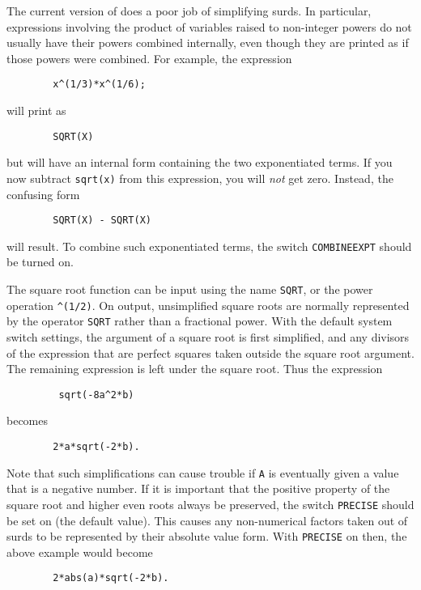 The current version of {\REDUCE} does a poor job of simplifying surds.  In
particular, expressions involving the product of variables raised to
non-integer powers do not usually have their powers combined internally,
even though they are printed as if those powers were combined.  For
example, the expression
\begin{verbatim}
        x^(1/3)*x^(1/6);
\end{verbatim}
will print as
\begin{verbatim}
        SQRT(X)
\end{verbatim}
but will have an internal form containing the two exponentiated terms.
If you now subtract {\tt sqrt(x)} from this expression, you will {\em not\/}
get zero.  Instead, the confusing form
\begin{verbatim}
        SQRT(X) - SQRT(X)
\end{verbatim}
will result.  To combine such exponentiated terms, the switch
{\tt COMBINEEXPT} should be turned on.

The square root function can be input using the name {\tt SQRT}, or the
power operation {\tt \verb|^|(1/2)}.  On output, unsimplified square roots
are normally represented by the operator {\tt SQRT} rather than a
fractional power.  With the default system switch settings, the argument
of a square root is first simplified, and any divisors of the expression
that are perfect squares taken outside the square root argument.  The
remaining expression is left under the square root.
Thus the expression
\begin{verbatim}
         sqrt(-8a^2*b)
 \end{verbatim}
becomes
\begin{verbatim}
        2*a*sqrt(-2*b).
\end{verbatim}

Note that such simplifications can cause trouble if {\tt A} is eventually
given a value that is a negative number.  If it is important that the
positive property of the square root and higher even roots always be
preserved, the switch {\tt PRECISE} should be set on
(the default value).
This causes any non-numerical factors taken out of surds to be represented
by their absolute value form.
With %
{\tt PRECISE} on then, the above example would become
\begin{verbatim}
        2*abs(a)*sqrt(-2*b).
\end{verbatim}

